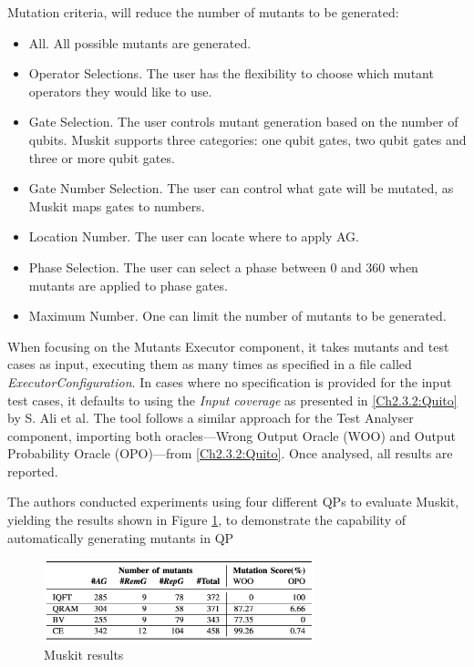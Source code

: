 \begin{itemize}
Mutation criteria, will reduce the number of mutants to be generated:
\begin{itemize}
    \item All. All possible mutants are generated.
    \item Operator Selections. The user has the flexibility to choose which mutant operators they would like to use.
    \item Gate Selection. The user controls mutant generation based on the number of qubits. Muskit supports three categories: one qubit gates, two qubit gates and three or more qubit gates. 
    \item Gate Number Selection. The user can control what gate will be mutated, as Muskit maps gates to numbers.
    \item Location Number. The user can locate where to apply AG.
    \item Phase Selection. The user can select a phase between 0 and 360 when mutants are applied to phase gates.
    \item Maximum Number. One can limit the number of mutants to be generated.
\end{itemize}

When focusing on the Mutants Executor component, it takes mutants and test cases as input, executing them as many times as specified in a file called \textit{ExecutorConfiguration}. In cases where no specification is provided for the input test cases, it defaults to using the \textit{Input coverage} as presented in \ref{Ch2.3.2:Quito}\cite{ali2021assessing} by S. Ali et al. The tool follows a similar approach for the Test Analyser component, importing both oracles—Wrong Output Oracle (WOO) and Output Probability Oracle (OPO)—from \ref{Ch2.3.2:Quito}\cite{ali2021assessing}. Once analysed, all results are reported.\newline

The authors conducted experiments using four different QPs to evaluate Muskit, yielding the results shown in Figure \ref{Fig:MuskitRes}, to demonstrate the capability of automatically generating mutants in QP

\begin{figure}[H]
        \centering
        \includegraphics[width=0.7\textwidth]{TFM/photos/MuskitResults.png}
        \caption{Muskit results \cite{mendiluze2021muskit}} 
        \label{Fig:MuskitRes}
\end{figure}


\end{itemize}
